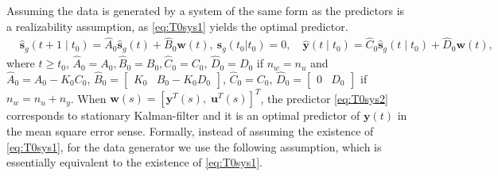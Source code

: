 \documentclass{article}
\def\rvu{{\mathbf{i}}}
\def\rvs{{\mathbf{s}}}
\def\rvu{{\mathbf{u}}}
\def\rvy{{\mathbf{y}}}
\newcommand{\e}{\mathbf{e}}
\newcommand{\y}{\mathbf{y}}
\newcommand{\w}{\mathbf{w}}
\newcommand{\bE}{\mathbf{E}}
\begin{document}
Assuming the data is generated by a system of the same form as the predictors is a realizability assumption, as \eqref{eq:T0sys1} yields the optimal predictor.
\begin{equation}
    \begin{split}
		&\hat{\rvs}_{g}(t+1 \mid t_0)\!\!=\!\!\hat{A}_0\hat{\rvs}_{g}(t)+\hat{B}_0\w(t), ~ \hat{\rvs}_g(t_0 | t_0)=0, \quad  
    \hat{\y}(t \mid t_0) \!\!=\!\! \hat{C}_0\hat{\rvs}_{g}(t \mid t_0)+\hat{D}_0\w(t), 
    \end{split}     
		\label{eq:T0sys2}
\end{equation}
where $t \ge t_0$,
 $\hat{A}_0=A_0,\hat{B}_0=B_0,\hat{C}_0=C_0$, $\hat{D}_0=D_0$
if $n_w=n_u$ and 
$\hat{A}_0=A_0-K_0C_0$, $\hat{B}_0=\begin{bmatrix} K_0 & B_0-K_0D_0 \end{bmatrix}$,
$\hat{C}_0=C_0$, $\hat{D}_0=\begin{bmatrix} 0 & D_0 \end{bmatrix}$ if $n_w=n_u+n_y$. 
When $\w(s)=[\rvy^T(s),\; \rvu^T(s) ]^T$, 
the predictor \eqref{eq:T0sys2} corresponds 
to stationary Kalman-filter and it is an optimal predictor of $\y(t)$ in the mean square error sense.
  Formally, instead of assuming the existence of \eqref{eq:T0sys1}, for the data generator  we use the following assumption, which is essentially equivalent to the existence of \eqref{eq:T0sys1}.
\end{document}
